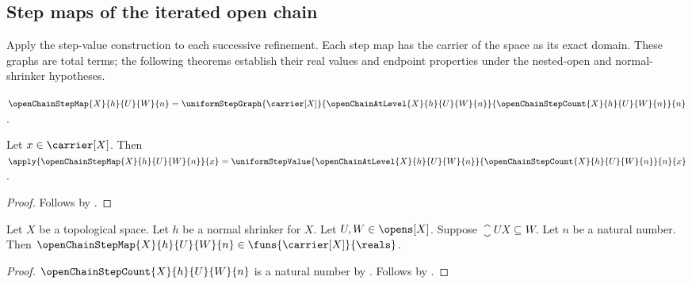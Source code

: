 \subsection{Step maps of the iterated open chain}

Apply the step-value construction to each successive refinement. Each step
map has the carrier of the space as its exact domain. These graphs are total
terms; the following theorems establish their real values and endpoint
properties under the nested-open and normal-shrinker hypotheses.

\begin{definition}\label{open_chain_step_map}
    $\openChainStepMap{X}{h}{U}{W}{n}
        =\uniformStepGraph{\carrier[X]}
            {\openChainAtLevel{X}{h}{U}{W}{n}}
            {\openChainStepCount{X}{h}{U}{W}{n}}{n}$.
\end{definition}

\begin{proposition}\label{open_chain_step_map_apply}
    Let $x\in\carrier[X]$.
    Then $\apply{\openChainStepMap{X}{h}{U}{W}{n}}{x}
        =\uniformStepValue{
            \openChainAtLevel{X}{h}{U}{W}{n}}
            {\openChainStepCount{X}{h}{U}{W}{n}}{n}{x}$.
\end{proposition}
\begin{proof}
    Follows by
        .
\end{proof}

\begin{theorem}\label{open_chain_step_map_typed}
    Let $X$ be a topological space.
    Let $h$ be a normal shrinker for $X$.
    Let $U,W\in\opens[X]$.
    Suppose $\closure{U}{X}\subseteq W$.
    Let $n$ be a natural number.
    Then $\openChainStepMap{X}{h}{U}{W}{n}
        \in\funs{\carrier[X]}{\reals}$.
\end{theorem}
\begin{proof}
    $\openChainStepCount{X}{h}{U}{W}{n}$ is a natural number
        by .
    Follows by
        .
\end{proof}

